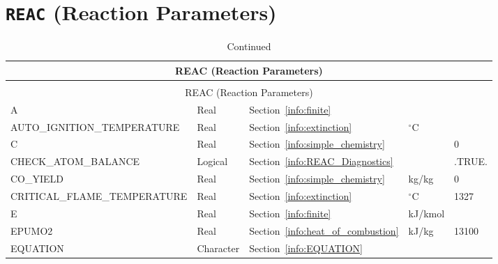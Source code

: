 \documentclass[11pt]{book}
\begin{document}
\vspace{\baselineskip}


\section{\texorpdfstring{{\tt REAC}}{REAC} (Reaction Parameters)}

\begin{longtable}{@{\extracolsep{\fill}}|l|l|l|l|l|}
\caption[Reaction parameters ({\ct REAC} namelist group)]{For more information see Chapter~\ref{chap:combustion}.}
\label{tbl:REAC} \\
\hline
\multicolumn{5}{|c|}{{\ct REAC} (Reaction Parameters)} \\
\hline \hline
\endfirsthead
\caption[]{Continued} \\
\hline
\multicolumn{5}{|c|}{{\ct REAC} (Reaction Parameters)} \\
\hline \hline
\endhead
{\ct A}                                   & Real        & Section~\ref{info:finite}                 &                   &     \\ \hline
{\ct AUTO\_IGNITION\_TEMPERATURE}         & Real        & Section~\ref{info:extinction}             & $^\circ$C         &     \\ \hline
{\ct C}                                   & Real        & Section~\ref{info:simple_chemistry}       &                   & 0    \\ \hline
{\ct CHECK\_ATOM\_BALANCE}                & Logical     & Section~\ref{info:REAC_Diagnostics}       &                   & {\ct .TRUE.}    \\ \hline
{\ct CO\_YIELD}                           & Real        & Section~\ref{info:simple_chemistry}       & kg/kg             & 0        \\ \hline
{\ct CRITICAL\_FLAME\_TEMPERATURE}        & Real        & Section~\ref{info:extinction}             &   $^\circ$C       & 1327    \\ \hline
{\ct E}                                   & Real        & Section~\ref{info:finite}                 &   kJ/kmol         &     \\ \hline
{\ct EPUMO2}                              & Real        & Section~\ref{info:heat_of_combustion}     &   kJ/kg           & 13100    \\ \hline
{\ct EQUATION}                            & Character   & Section~\ref{info:EQUATION}               &                   &          \\ \hline

\end{longtable}
\end{document}
